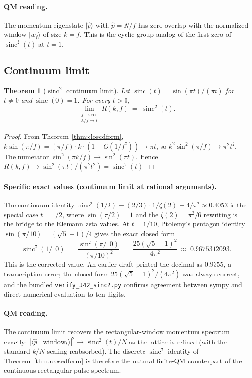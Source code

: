 \documentclass[11pt,reqno]{amsart}
\theoremstyle{plain}
\newtheorem{theorem}{Theorem}[section]
\theoremstyle{definition}
\theoremstyle{remark}
\DeclareMathOperator{\sinc}{sinc}
\begin{document}
\paragraph{QM reading.} The momentum eigenstate $|\hat p\rangle$ with $\hat p = N/f$ has
zero overlap with the normalized window $|w_{f}\rangle$ of size $k = f$. This is the
cyclic-group analog of the first zero of $\sinc^{2}(t)$ at $t = 1$.

\subsection{Continuum limit}
\label{subsec:continuum}

\begin{theorem}[$\sinc^{2}$ continuum limit]
\label{thm:continuum}
Let $\sinc(t) = \sin(\pi t)/(\pi t)$ for $t \neq 0$ and $\sinc(0) = 1$. For every $t > 0$,
\[
  \lim_{\substack{f \to \infty \\ k/f \to t}} R(k,f) \;=\; \sinc^{2}(t).
\]
\end{theorem}

\begin{proof}
From Theorem~\ref{thm:closedform}, $k\sin(\pi/f) = (\pi/f)\cdot k\cdot(1+O(1/f^{2}))
\to \pi t$, so $k^{2}\sin^{2}(\pi/f) \to \pi^{2}t^{2}$. The numerator
$\sin^{2}(\pi k/f) \to \sin^{2}(\pi t)$. Hence
$R(k,f) \to \sin^{2}(\pi t)/(\pi^{2}t^{2}) = \sinc^{2}(t)$.
\end{proof}

\paragraph{Specific exact values (continuum limit at rational arguments).}
The continuum identity $\sinc^{2}(1/2) = (2/3)\cdot 1/\zeta(2) = 4/\pi^{2}
\approx 0.4053$ is the special case $t = 1/2$, where $\sin(\pi/2) = 1$ and the
$\zeta(2) = \pi^{2}/6$ rewriting is the bridge to the Riemann zeta values. At
$t = 1/10$, Ptolemy's pentagon identity $\sin(\pi/10) = (\sqrt{5}-1)/4$ gives the exact
closed form
\[
  \sinc^{2}(1/10) \;=\; \frac{\sin^{2}(\pi/10)}{(\pi/10)^{2}}
  \;=\; \frac{25(\sqrt{5}-1)^{2}}{4\pi^{2}}
  \;\approx\; 0.9675312093.
\]
This is the corrected value. An earlier draft printed the decimal as $0.9355$, a
transcription error; the closed form $25(\sqrt{5}-1)^{2}/(4\pi^{2})$ was always correct,
and the bundled \texttt{verify\_J42\_sinc2.py} confirms agreement between sympy and direct
numerical evaluation to ten digits.

\paragraph{QM reading.}
The continuum limit recovers the rectangular-window momentum spectrum exactly:
$|\langle \hat p \mid \text{window}_{t}\rangle|^{2} \to \sinc^{2}(t)/N$ as the lattice is
refined (with the standard $k/N$ scaling reabsorbed). The discrete $\sinc^{2}$ identity
of Theorem~\ref{thm:closedform} is therefore the natural finite-QM counterpart of the
continuous rectangular-pulse spectrum.
\end{document}
